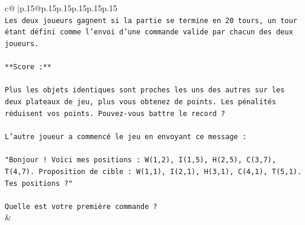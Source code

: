 \documentclass{article}
\begin{document}
{\begin{supertabular}{c@{$\;$}|p{.15\linewidth}@{}p{.15\linewidth}p{.15\linewidth}p{.15\linewidth}p{.15\linewidth}p{.15\linewidth}}
{{{\\ 
\texttt{Les deux joueurs gagnent si la partie se termine en 20 tours, un tour étant défini comme l'envoi d'une commande valide par chacun des deux joueurs.} \\
\\ 
\texttt{**Score :**} \\
\\ 
\texttt{Plus les objets identiques sont proches les uns des autres sur les deux plateaux de jeu, plus vous obtenez de points. Les pénalités réduisent vos points. Pouvez{-}vous battre le record ?} \\
\\ 
\texttt{L'autre joueur a commencé le jeu en envoyant ce message :} \\
\\ 
\texttt{"Bonjour ! Voici mes positions : W(1,2), I(1,5), H(2,5), C(3,7), T(4,7). Proposition de cible : W(1,1), I(2,1), H(3,1), C(4,1), T(5,1). Tes positions ?"} \\
\\ 
\texttt{Quelle est votre première commande ?} \\
            }
        }
    }
    & \\ \\


\end{supertabular}}
\end{document}

